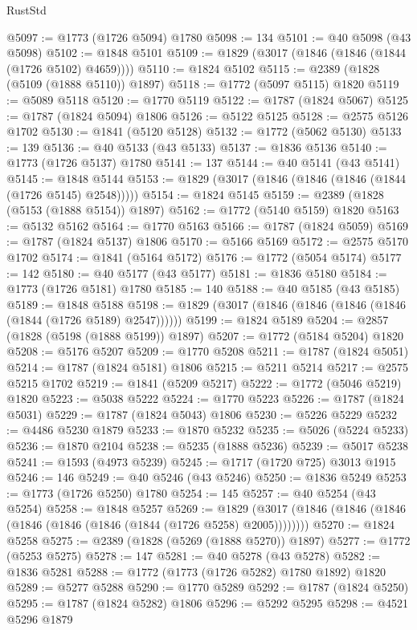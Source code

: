 \begin{lexlean}{RustStd}
\begin{coremodule}
@5097 := @1773 (@1726 @5094) @1780
@5098 := 134
@5101 := @40 @5098 (@43 @5098)
@5102 := @1848 @5101
@5109 := @1829 (@3017 (@1846 (@1846 (@1844 (@1726 @5102) @4659))))
@5110 := @1824 @5102
@5115 := @2389 (@1828 (@5109 (@1888 @5110)) @1897)
@5118 := @1772 (@5097 @5115) @1820
@5119 := @5089 @5118
@5120 := @1770 @5119
@5122 := @1787 (@1824 @5067)
@5125 := @1787 (@1824 @5094) @1806
@5126 := @5122 @5125
@5128 := @2575 @5126 @1702
@5130 := @1841 (@5120 @5128)
@5132 := @1772 (@5062 @5130)
@5133 := 139
@5136 := @40 @5133 (@43 @5133)
@5137 := @1836 @5136
@5140 := @1773 (@1726 @5137) @1780
@5141 := 137
@5144 := @40 @5141 (@43 @5141)
@5145 := @1848 @5144
@5153 := @1829 (@3017 (@1846 (@1846 (@1846 (@1844 (@1726 @5145) @2548)))))
@5154 := @1824 @5145
@5159 := @2389 (@1828 (@5153 (@1888 @5154)) @1897)
@5162 := @1772 (@5140 @5159) @1820
@5163 := @5132 @5162
@5164 := @1770 @5163
@5166 := @1787 (@1824 @5059)
@5169 := @1787 (@1824 @5137) @1806
@5170 := @5166 @5169
@5172 := @2575 @5170 @1702
@5174 := @1841 (@5164 @5172)
@5176 := @1772 (@5054 @5174)
@5177 := 142
@5180 := @40 @5177 (@43 @5177)
@5181 := @1836 @5180
@5184 := @1773 (@1726 @5181) @1780
@5185 := 140
@5188 := @40 @5185 (@43 @5185)
@5189 := @1848 @5188
@5198 := @1829 (@3017 (@1846 (@1846 (@1846 (@1846 (@1844 (@1726 @5189) @2547))))))
@5199 := @1824 @5189
@5204 := @2857 (@1828 (@5198 (@1888 @5199)) @1897)
@5207 := @1772 (@5184 @5204) @1820
@5208 := @5176 @5207
@5209 := @1770 @5208
@5211 := @1787 (@1824 @5051)
@5214 := @1787 (@1824 @5181) @1806
@5215 := @5211 @5214
@5217 := @2575 @5215 @1702
@5219 := @1841 (@5209 @5217)
@5222 := @1772 (@5046 @5219) @1820
@5223 := @5038 @5222
@5224 := @1770 @5223
@5226 := @1787 (@1824 @5031)
@5229 := @1787 (@1824 @5043) @1806
@5230 := @5226 @5229
@5232 := @4486 @5230 @1879
@5233 := @1870 @5232
@5235 := @5026 (@5224 @5233)
@5236 := @1870 @2104
@5238 := @5235 (@1888 @5236)
@5239 := @5017 @5238
@5241 := @1593 (@4973 @5239)
@5245 := @1717 (@1720 @725) @3013 @1915
@5246 := 146
@5249 := @40 @5246 (@43 @5246)
@5250 := @1836 @5249
@5253 := @1773 (@1726 @5250) @1780
@5254 := 145
@5257 := @40 @5254 (@43 @5254)
@5258 := @1848 @5257
@5269 := @1829 (@3017 (@1846 (@1846 (@1846 (@1846 (@1846 (@1846 (@1844 (@1726 @5258) @2005))))))))
@5270 := @1824 @5258
@5275 := @2389 (@1828 (@5269 (@1888 @5270)) @1897)
@5277 := @1772 (@5253 @5275)
@5278 := 147
@5281 := @40 @5278 (@43 @5278)
@5282 := @1836 @5281
@5288 := @1772 (@1773 (@1726 @5282) @1780 @1892) @1820
@5289 := @5277 @5288
@5290 := @1770 @5289
@5292 := @1787 (@1824 @5250)
@5295 := @1787 (@1824 @5282) @1806
@5296 := @5292 @5295
@5298 := @4521 @5296 @1879

\end{coremodule}
\end{lexlean}
